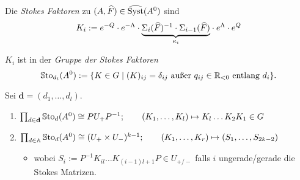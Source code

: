 \begin{defn}
  Die \emph{Stokes Faktoren} zu $(A,\widehat F)\in\widehat{\operatorname{Syst}}(A^0)$ sind
  \[
    K_i:= e^{-Q}\cdot e^{-\Lambda} \cdot \underset{\kappa_i}{\underbrace{%
      \Sigma_i(\hat F)^{-1}\cdot \Sigma_{i-1}(\hat F)}}
    \cdot  e^{\Lambda}\cdot e^{Q}
  \]
  \begin{lem}
    $K_i$ ist in der \emph{Gruppe der Stokes Faktoren}
    \[
      \operatorname{\mathbb{S}to}_{d_i}(A^0) := \{K \in G \mid (K)_{ij}
      =\delta_{ij} \text{ außer } q_{ij}\in\mathbb{R}_{<0}\text{ entlang } d_i \}.
    \]
  \end{lem}
\end{defn}
\begin{lem}[3.2]
  Sei $\textbf{d}=(d_1,\dots,d_l)$.
  \begin{enumerate}
    \item $\prod_{d\in\textbf{d}}\operatorname{\mathbb{S}to}_d(A^0)\cong PU_+P^{-1};
      \qquad
      (K_1,\dots,K_l)\mapsto K_l\dots K_2K_1\in G$
    \item $\prod_{d\in\mathbb{A}}\operatorname{\mathbb{S}to}_d(A^0)\cong (U_+\times U_-)^{k-1};
      \qquad
      (K_1,\dots,K_r)\mapsto (S_1,\dots,S_{2k-2})$
      \begin{itemize}
        \item wobei $S_i:=P^{-1}K_{il}\dots K_{(i-1)l+1}P\in U_{+/-}$ falls $i$
          ungerade/gerade die Stokes Matrizen.
      \end{itemize}
  \end{enumerate}
\end{lem}
